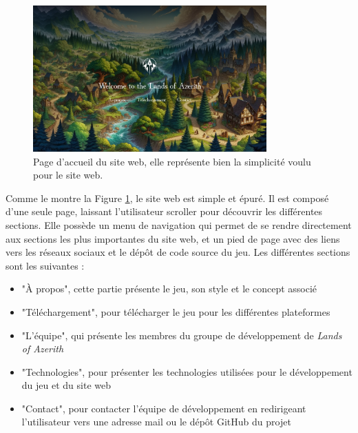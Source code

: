 \begin{figure}[H]
    \centering
    \includegraphics[width=0.8\textwidth]{assets/website1.png}
    \caption{Page d'accueil du site web, elle représente bien la simplicité voulu pour le site web.}
    \label{fig:website1}
\end{figure}

Comme le montre la Figure \ref*{fig:website1}, le site web est simple et épuré.
Il est composé d'une seule page, laissant l'utilisateur scroller pour découvrir les différentes sections.
Elle possède un menu de navigation qui permet de se rendre directement aux sections les plus importantes du site web, et un pied de page avec des liens vers les réseaux sociaux et le dépôt de code source du jeu.
Les différentes sections sont les suivantes :
\\

\begin{itemize}

    \item "À propos", cette partie présente le jeu, son style et le concept associé
          \\

    \item "Téléchargement", pour télécharger le jeu pour les différentes plateformes
          \\

    \item "L'équipe", qui présente les membres du groupe de développement de \textit{Lands of Azerith}
          \\

    \item "Technologies", pour présenter les technologies utilisées pour le développement du jeu et du site web
          \\

    \item "Contact", pour contacter l'équipe de développement en redirigeant l'utilisateur vers une adresse mail ou le dépôt GitHub du projet

\end{itemize}

